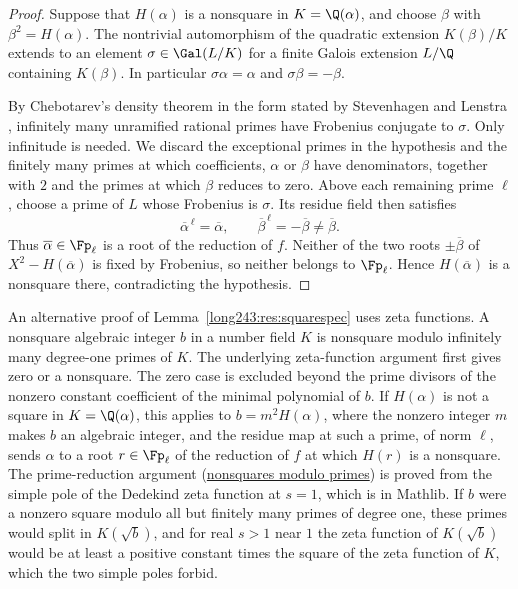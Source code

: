 \begin{proof}
Suppose that $H(\alpha)$ is a nonsquare in $K=\Q(\alpha)$, and
choose $\beta$ with $\beta^2=H(\alpha)$. The nontrivial automorphism
of the quadratic extension $K(\beta)/K$ extends to an element
$\sigma\in\Gal(L/K)$ for a finite Galois extension $L/\Q$ containing
$K(\beta)$. In particular $\sigma\alpha=\alpha$ and
$\sigma\beta=-\beta$.

By Chebotarev's density theorem in the form stated by Stevenhagen
and Lenstra \cite[\S3, p.~15]{stevenhagenlenstra1996}, infinitely many
unramified rational primes have Frobenius conjugate to $\sigma$.
Only infinitude is needed. We discard the exceptional primes in the
hypothesis and the finitely many primes at which coefficients, $\alpha$
or $\beta$ have denominators, together with $2$ and the primes at which
$\beta$ reduces to zero. Above each
remaining prime $\ell$, choose a prime of $L$ whose Frobenius is
$\sigma$. Its residue field then satisfies
\[
 \overline\alpha^{\,\ell}=\overline\alpha,\qquad
 \overline\beta^{\,\ell}=-\overline\beta\ne\overline\beta.
\]
Thus $\overline\alpha\in\Fp_\ell$ is a root of the reduction of $f$.
Neither of the two roots $\pm\overline\beta$ of
$X^2-H(\overline\alpha)$ is fixed by Frobenius, so neither belongs
to $\Fp_\ell$. Hence $H(\overline\alpha)$ is a nonsquare there,
contradicting the hypothesis.
\end{proof}

An alternative proof of Lemma~\ref{long243:res:squarespec} uses zeta
functions. A nonsquare algebraic integer $b$ in a number field $K$
is nonsquare modulo infinitely many degree-one primes of $K$. The underlying
zeta-function argument first gives zero or a nonsquare. The zero case is
excluded beyond the prime divisors of the nonzero constant coefficient of the
minimal polynomial of $b$. If
$H(\alpha)$ is not a square in $K=\Q(\alpha)$, this applies to
$b=m^2H(\alpha)$, where the nonzero integer $m$ makes $b$ an algebraic
integer, and the residue map at such a prime, of norm $\ell$, sends $\alpha$
to a root $r\in\Fp_\ell$ of the reduction of $f$ at which $H(r)$ is a
nonsquare. The prime-reduction argument
(\href{https://github.com/wcook04/plectis-erdos/blob/e21782a3e5edf1d7e2e7bfca67341356dacfc042/lean/ErdosProblems/Shared/NonsquareModuloPrimes.lean\#L160-L192}{nonsquares modulo primes})
is proved from the simple pole of the Dedekind zeta function at $s=1$, which
is in Mathlib. If $b$ were a nonzero square modulo all but finitely many
primes of degree one, these primes would split in $K(\sqrt b)$, and for real
$s>1$ near $1$ the zeta function of $K(\sqrt b)$ would be at least a positive
constant times the square of the zeta function of $K$, which the two simple
poles forbid.


